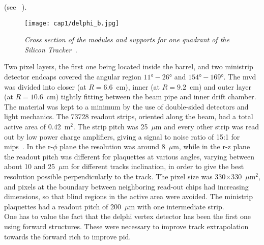 (see ~).
\begin{figure}[!htbp]
  \centering\texttt{[image: cap1/delphi\_b.jpg]}
  \caption{\textit{Cross section of the modules and supports for one quadrant of
      the Silicon Tracker~\cite{Delphi_b}.}}\label{delphi_b}
\end{figure}
Two pixel layers, the first one being located inside the barrel, and two
ministrip detector endcaps covered the angular region $\ang{11}-\ang{26}$ and
$\ang{154}-\ang{169}$. The \gls{mvd} was divided into closer (at $R=6.6$~cm),
inner (at $R=9.2$~cm) and outer layer (at $R=10.6$~cm) tightly fitting between
the beam pipe and inner drift chamber. The material was kept to a minimum by the
use of double-sided detectors and light mechanics. The 73728 readout strips,
oriented along the beam, had a total active area of 0.42~m$^2$. The strip pitch
was 25~$\mu$m and every other strip was read out by low power charge amplifiers,
giving a signal to noise ratio of 15:1 for \glspl{mip}~\cite{Delphi_a}. In the
r-$\phi$ plane the resolution was around 8~$\mu$m, while in the r-z plane the
readout pitch was different for plaquettes at various angles, varying between
about 10 and 25~$\mu$m for different tracks inclination, in order to give the
best resolution possible perpendicularly to the track. The pixel size was
330$\times$330~$\mu$m$^2$, and pixels at the boundary between neighboring
read-out chips had increasing dimensions, so that blind regions in the active
area were avoided. The ministrip plaquettes had
a readout pitch of 200~$\mu$m with one intermediate strip.\\
One has to value the fact that the \gls{delphi} vertex detector has been the
first one using forward structures. These were necessary to improve track
extrapolation towards the forward \gls{rich} to improve \gls{pid}.


